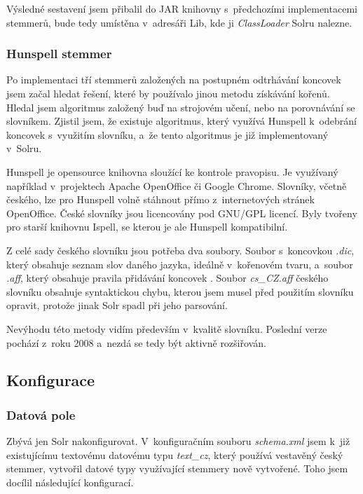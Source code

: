 Výsledné sestavení jsem přibalil do JAR knihovny s~předchozími implementacemi stemmerů, bude tedy umístěna v~adresáři Lib, kde ji \emph{ClassLoader} Solru nalezne.

\subsubsection{Hunspell stemmer}
Po implementaci tří stemmerů založených na postupném odtrhávání koncovek jsem začal hledat řešení, které by používalo jinou metodu získávání kořenů. Hledal jsem algoritmus založený buď na strojovém učení, nebo na porovnávání se slovníkem. Zjistil jsem, že existuje algoritmus, který využívá Hunspell k~odebrání koncovek s~využitím slovníku, a~že tento algoritmus je již implementovaný v~Solru.

Hunspell je opensource knihovna sloužící ke kontrole pravopisu. Je využívaný například v~projektech Apache OpenOffice či Google Chrome. Slovníky, včetně českého, lze pro Hunspell volně stáhnout přímo z~internetových stránek OpenOffice\cite{openoffice}. České slovníky jsou licencovány pod GNU/GPL licencí. Byly tvořeny pro starší knihovnu Ispell, se kterou je ale Hunspell kompatibilní.

Z celé sady českého slovníku jsou potřeba dva soubory. Soubor s~koncovkou \emph{.dic}, který obsahuje seznam slov daného jazyka, ideálně v~kořenovém tvaru, a~soubor \emph{.aff}, který obsahuje pravila přidávání koncovek \cite{zdrojak}. Soubor \emph{cs\_CZ.aff} českého slovníku obsahuje syntaktickou chybu, kterou jsem musel před použitím slovníku opravit, protože jinak Solr spadl při jeho parsování.

Nevýhodu této metody vidím především v~kvalitě slovníku. Poslední verze pochází z~roku 2008 a~nezdá se tedy být aktivně rozšiřován.

\subsection{Konfigurace} \label{sorlconfig}
\subsubsection{Datová pole}
Zbývá jen Solr nakonfigurovat. V~konfiguračním souboru \emph{schema.xml} jsem k~již existujícímu textovému datovému typu \emph{text\_cz}, který používá vestavěný český stemmer, vytvořil datové typy využívající stemmery nově vytvořené. Toho jsem docílil následující konfigurací.

